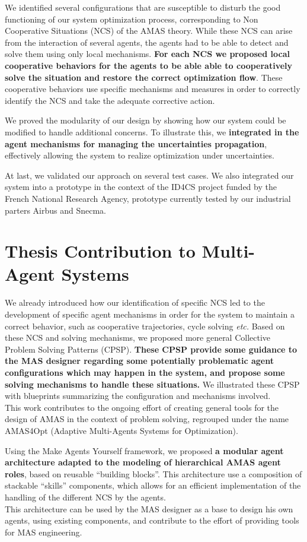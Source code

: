 We identified several configurations that are susceptible to disturb the good functioning of our system optimization process, corresponding to Non Cooperative Situations (NCS) of the AMAS theory. While these NCS can arise from the interaction of several agents, the agents had to be able to detect and solve them using only local mechanisms. \textbf{For each NCS we proposed local cooperative behaviors for the agents to be able able to cooperatively solve the situation and restore the correct optimization flow}. These cooperative behaviors use specific mechanisms and measures in order to correctly identify the NCS and take the adequate corrective action.

We proved the modularity of our design by showing how our system could be modified to handle additional concerns. To illustrate this, we \textbf{integrated in the agent mechanisms for managing the uncertainties propagation}, effectively allowing the system to realize optimization under uncertainties.

At last, we validated our approach on several test cases. We also integrated our system into a prototype in the context of the ID4CS project funded by the French National Research Agency, prototype currently tested by our industrial parters Airbus and Snecma.

\section*{Thesis Contribution to Multi-Agent Systems}

We already introduced how our identification of specific NCS led to the development of specific agent mechanisms in order for the system to maintain a correct behavior, such as cooperative trajectories, cycle solving \emph{etc.} Based on these NCS and solving mechanisms, we proposed more general Collective Problem Solving Patterns (CPSP). \textbf{These CPSP provide some guidance to the MAS designer regarding some potentially problematic agent configurations which may happen in the system, and propose some solving mechanisms to handle these situations.} We illustrated these CPSP with blueprints summarizing the configuration and mechanisms involved.\\
This work contributes to the ongoing effort of creating general tools for the design of AMAS in the context of problem solving, regrouped under the name AMAS4Opt (Adaptive Multi-Agents Systems for Optimization).

Using the Make Agents Yourself framework, we proposed \textbf{a modular agent architecture adapted to the modeling of hierarchical AMAS agent roles}, based on reusable \enquote{building blocks}. This architecture use a composition of stackable \enquote{skills} components, which allows for an efficient implementation of the handling of the different NCS by the agents.\\
This architecture can be used by the MAS designer as a base to design his own agents, using existing components, and contribute to the effort of providing tools for MAS engineering.

